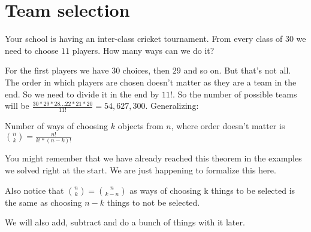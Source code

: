 \section{Team selection}
Your school is having an inter-class cricket tournament. From every class of $30$ we need to choose $11$ players. 
How many ways can we do it?\par
For the first players we have $30$ choices, then $29$ and so on. But that's not all. The order in which players 
are chosen doesn't matter as they are a team in the end. So we need to divide it in the end by $11!$. 
So the number of possible teams will be $\frac{30*29*28 \dots 22*21 *20}{11!}=54,627,300$. Generalizing:
\begin{theorem}
    Number of ways of choosing $k$ objects from $n$, where order doesn't matter is 
    $\binom{n}{k}=\frac{n!}{k!*(n-k)!}$
\end{theorem}
You might remember that we have already reached this theorem in the examples we solved right at the start. 
We are just happening to formalize this here.\par
Also notice that $\binom{n}{k}=\binom{n}{k-n}$ as ways of choosing k things to be 
selected is the same as choosing $n-k$ things to not be selected.\par
We will also add, subtract and do a bunch of things with it later.
